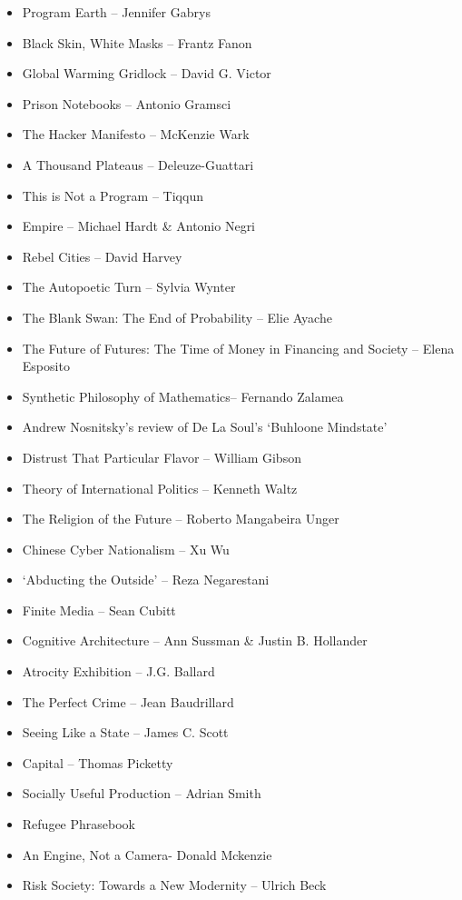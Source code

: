 \documentclass[
]{article}
\begin{document}
\begin{itemize}
\item
  Program Earth -- Jennifer Gabrys
\item
  Black Skin, White Masks -- Frantz Fanon
\item
  Global Warming Gridlock -- David G. Victor
\item
  Prison Notebooks -- Antonio Gramsci
\item
  The Hacker Manifesto -- McKenzie Wark
\item
  A Thousand Plateaus -- Deleuze-Guattari
\item
  This is Not a Program -- Tiqqun
\item
  Empire -- Michael Hardt \& Antonio Negri
\item
  Rebel Cities -- David Harvey
\item
  The Autopoetic Turn -- Sylvia Wynter
\item
  The Blank Swan: The End of Probability -- Elie Ayache
\item
  The Future of Futures: The Time of Money in Financing and Society --
  Elena Esposito
\item
  Synthetic Philosophy of Mathematics-- Fernando Zalamea
\item
  Andrew Nosnitsky's review of De La Soul's `Buhloone Mindstate'
\item
  Distrust That Particular Flavor -- William Gibson
\item
  Theory of International Politics -- Kenneth Waltz
\item
  The Religion of the Future -- Roberto Mangabeira Unger
\item
  Chinese Cyber Nationalism -- Xu Wu
\item
  `Abducting the Outside' -- Reza Negarestani
\item
  Finite Media -- Sean Cubitt
\item
  Cognitive Architecture -- Ann Sussman \& Justin B. Hollander
\item
  Atrocity Exhibition -- J.G. Ballard
\item
  The Perfect Crime -- Jean Baudrillard
\item
  Seeing Like a State -- James C. Scott
\item
  Capital -- Thomas Picketty
\item
  Socially Useful Production -- Adrian Smith
\item
  Refugee Phrasebook
\item
  An Engine, Not a Camera- Donald Mckenzie
\item
  Risk Society: Towards a New Modernity -- Ulrich Beck

\end{itemize}
\end{document}
